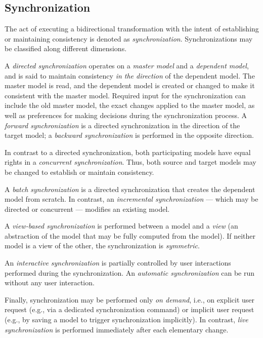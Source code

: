 \subsection{Synchronization}
\label{sec:Synchronization}

The act of executing a bidirectional transformation with the intent of establishing or maintaining consistency is denoted as \emph{synchronization}. 
Synchronizations may be classified along different dimensions.

A \emph{directed synchronization} operates on a \emph{master model} and a \emph{dependent model}, and is said to maintain consistency \emph{in the direction} of the dependent model. 
The master model is read, and the dependent model is created or changed to make it consistent with the master model. 
Required input for the synchronization can include the old master model, the exact changes applied to the master model, as well as preferences for making decisions during the synchronization process.  
A \emph{forward synchronization} is a directed synchronization in the direction of the target model; a \emph{backward synchronization} is performed in the opposite direction.

In contrast to a directed synchronization, both participating models have equal rights in a \emph{concurrent synchronization}. Thus, both source and target models may be changed to establish or maintain consistency.

A \emph{batch synchronization} is a directed synchronization that creates the dependent model from scratch. In contrast, an \emph{incremental synchronization} --- which may be directed or concurrent --- modifies an existing model.

A \emph{view-based synchronization} is performed between a model and a \emph{view} (an abstraction of the model that may be fully computed from the model). If neither model is a view of the other, the synchronization is \emph{symmetric}. 

An \emph{interactive synchronization} is partially controlled by user interactions performed during the synchronization. An \emph{automatic synchronization} can be run without any user interaction.

Finally, synchronization may be performed only \emph{on demand}, i.e., on explicit user request (e.g., via a dedicated synchronization command) or implicit user request (e.g., by saving a model to trigger synchronization implicitly).
In contrast, \emph{live synchronization} is performed immediately after each elementary change.  

